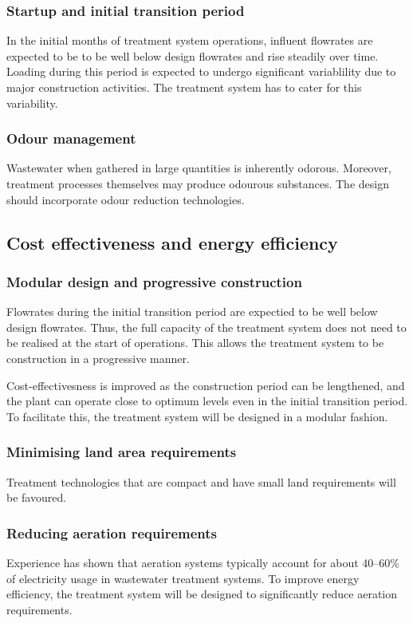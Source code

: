 \documentclass[a4paper,10pt]{article}
\begin{document}
\enlargethispage{\baselineskip}
\subsubsection{Startup and initial transition period}
\label{sec:startup_and_initial_transition_period}
In the initial months of treatment system operations, influent flowrates are expected to be to be well below design flowrates and rise steadily over time. 
Loading during this period is expected to undergo significant variablility due to major construction activities. 
The treatment system has to cater for this variability.

\subsubsection{Odour management}
Wastewater when gathered in large quantities is inherently odorous. Moreover, treatment processes themselves may produce odourous substances. The design should incorporate odour reduction technologies. 


\subsection{Cost effectiveness and energy efficiency}
\subsubsection{Modular design and progressive construction}
Flowrates during the initial transition period are expectied to be well below design flowrates. 
Thus, the full capacity of the treatment system does not need to be realised at the start of operations.
This allows the treatment system to be construction in a progressive manner. 

Cost-effectivesness is improved as the construction period can be lengthened, and the plant can operate close to optimum levels even in the initial transition period. 
To facilitate this, the treatment system will be designed in a modular fashion.

\subsubsection{Minimising land area requirements}
Treatment technologies that are compact and have small land requirements will be favoured.

\subsubsection{Reducing aeration requirements}
Experience has shown that aeration systems typically account for about 40--60\% of electricity usage in wastewater treatment systems. To improve energy efficiency, the treatment system will be designed to significantly reduce aeration requirements.
\end{document}
